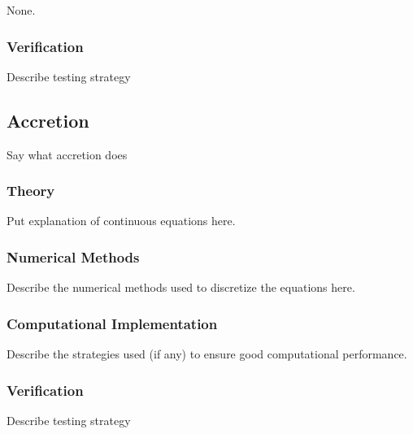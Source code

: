 None.

\subsubsection{Verification}

Describe testing strategy

\subsection{Accretion}

Say what accretion does

\subsubsection{Theory}

Put explanation of continuous equations here.

\subsubsection{Numerical Methods}

Describe the numerical methods used to discretize the equations here.

\subsubsection{Computational Implementation}

Describe the strategies used (if any) to ensure good computational performance.

\subsubsection{Verification}

Describe testing strategy


